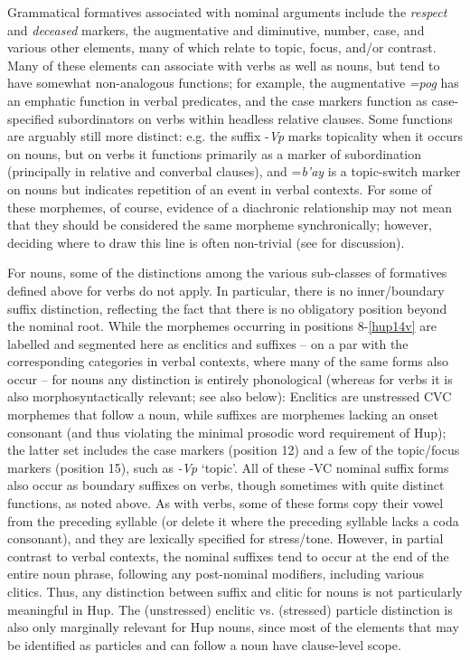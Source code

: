 \documentclass[output=paper]{langscibook}
\begin{document}
Grammatical formatives associated with nominal arguments include the \textit{respect} and \textit{deceased} markers, the augmentative and diminutive, number, case, and various other elements, many of which relate to topic, focus, and/or contrast. Many of these elements can associate with verbs as well as nouns, but tend to have somewhat non-analogous functions; for example, the augmentative \textit{=pog} has an emphatic function in verbal predicates, and the case markers function as case-specified subordinators on verbs within headless relative clauses. Some functions are arguably still more distinct: e.g. the suffix -\textit{Vp} marks topicality when it occurs on nouns, but on verbs it functions primarily as a marker of subordination (principally in relative and converbal clauses), and =\textit{b'ay} is a topic-switch marker on nouns but indicates repetition of an event in verbal contexts. For some of these morphemes, of course, evidence of a diachronic relationship may not mean that they should be considered the same morpheme synchronically; however, deciding where to draw this line is often non-trivial (see \citealt{Epps2008} for discussion). 

For nouns, some of the distinctions among the various sub-classes of formatives defined above for verbs do not apply. In particular, there is no inner{\slash}boun\-dary suffix distinction, reflecting the fact that there is no obligatory position beyond the nominal root. While the morphemes occurring in positions 8-\ref{hup14v} are labelled and segmented here as enclitics and suffixes – on a par with the corresponding categories in verbal contexts, where many of the same forms also occur – for nouns any distinction is entirely phonological (whereas for verbs it is also morphosyntactically relevant; see also  below): Enclitics are unstressed CVC morphemes that follow a noun, while suffixes are morphemes lacking an onset consonant (and thus violating the minimal prosodic word requirement of Hup); the latter set includes the case markers (position 12) and a few of the topic/focus markers (position 15), such as \textit{{}-Vp} `topic'. All of these -VC nominal suffix forms also occur as boundary suffixes on verbs, though sometimes with quite distinct functions, as noted above. As with verbs, some of these forms copy their vowel from the preceding syllable (or delete it where the preceding syllable lacks a coda consonant), and they are lexically specified for stress/tone. However, in partial contrast to verbal contexts, the nominal suffixes tend to occur at the end of the entire noun phrase, following any post-nominal modifiers, including various clitics. Thus, any distinction between suffix and clitic for nouns is not particularly meaningful in Hup. The (unstressed) enclitic vs. (stressed) particle distinction is also only marginally relevant for Hup nouns, since most of the elements that may be identified as particles and can follow a noun have clause-level scope.
\end{document}

